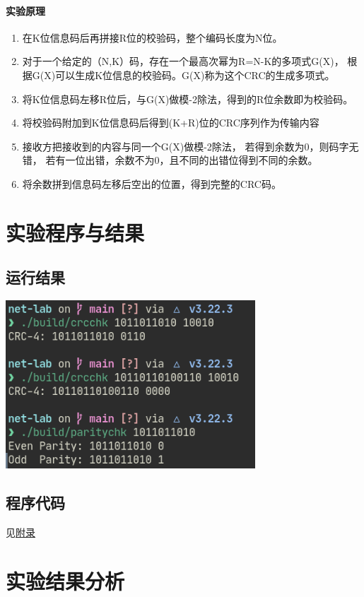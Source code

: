 \documentclass[a4paper]{ctexart}
\begin{document}
    \paragraph{实验原理}
    \begin{enumerate}
      \item 在K位信息码后再拼接R位的校验码，整个编码长度为N位。
      \item 对于一个给定的（N,K）码，存在一个最高次幂为R=N-K的多项式G(X)，
            根据G(X)可以生成K位信息的校验码。G(X)称为这个CRC的生成多项式。
      \item 将K位信息码左移R位后，与G(X)做模-2除法，得到的R位余数即为校验码。
      \item 将校验码附加到K位信息码后得到(K+R)位的CRC序列作为传输内容
      \item 接收方把接收到的内容与同一个G(X)做模-2除法， 若得到余数为0，则码字无错，
            若有一位出错，余数不为0，且不同的出错位得到不同的余数。
      \item 将余数拼到信息码左移后空出的位置，得到完整的CRC码。
    \end{enumerate}

    \newpage
    \section{实验程序与结果}
    \subsection{运行结果}
    \includegraphics[width=0.7\textwidth]{fig/result.png}
    \subsection{程序代码}
    见\hyperlink{appendix}{附录}

    \section{实验结果分析}
\end{document}
